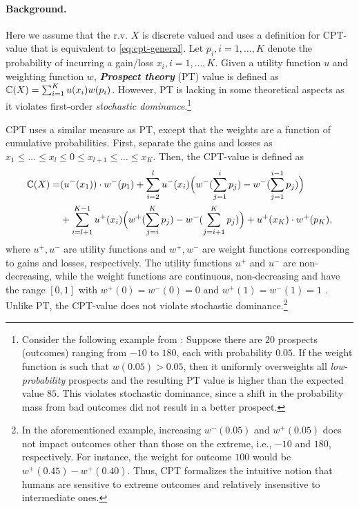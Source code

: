 \paragraph{Background.}
Here we assume that the r.v. $X$ is discrete valued and uses a definition for CPT-value that is equivalent to \eqref{eq:cpt-general}.
Let $p_i, i=1,\ldots,K$ denote the probability of incurring a gain/loss $x_i, i=1,\ldots,K$. %
Given a utility function $u$ and weighting function $w$, \textit{\textbf{Prospect theory}} (PT) value is defined as $\mathbb{C}(X) = \sum_{i=1}^K u(x_i) w(p_i)$. 
However, PT is lacking in some theoretical aspects as it violates first-order \textit{stochastic dominance}.\footnote{Consider the following example from \cite{fennema1997original}: Suppose there are $20$ prospects (outcomes) ranging from $-10$ to $180$, each with probability $0.05$. If the weight function is such that $w(0.05) > 0.05$, then it uniformly overweights all \textit{low-probability} prospects and the resulting PT value is higher than the expected value $85$. This violates stochastic dominance, since a shift in the probability mass from bad outcomes did not result in a better prospect.}

CPT uses a similar measure as PT, except that the weights are a function of cumulative probabilities. First, separate the gains and losses as 
$x_1\le \ldots \le x_l \le 0 \le x_{l+1} \le \ldots \le x_K$. Then, the CPT-value is defined as 
\begin{align}
\label{eq:cpt-discrete}
\mathbb{C}(X) = &(u^-(x_1))\cdot w^-(p_1) 
+\sum_{i=2}^l u^-(x_i) \Big(w^-(\sum_{j=1}^i p_j) - w^-(\sum_{j=1}^{i-1} p_j)\Big) 
\\&
 + \sum_{i=l+1}^{K-1} u^+(x_i) \Big(w^+(\sum_{j=i}^K p_j) - w^-(\sum_{j=i+1}^K p_j) \Big)
 + u^+(x_K)\cdot w^+(p_K), 
\end{align} 
where $u^+, u^-$ are utility functions and $w^+, w^-$ are weight functions corresponding to gains and losses, respectively. The utility functions $u^+$ and $u^-$ are non-decreasing, while the weight functions are continuous, non-decreasing and have the range $[0,1]$ with $w^+(0)=w^-(0)=0$ and $w^+(1)=w^-(1)=1$ . 
Unlike PT, the CPT-value does not violate stochastic dominance.\footnote{In the aforementioned example, increasing $w^-(0.05)$ and $w^+(0.05)$ does not impact outcomes other than those on the extreme, i.e., $-10$ and $180$, respectively. For instance, the weight for outcome $100$ would be $w^+(0.45) - w^+(0.40)$. Thus, CPT formalizes the intuitive notion that humans are sensitive to extreme outcomes and relatively insensitive to intermediate ones.}

